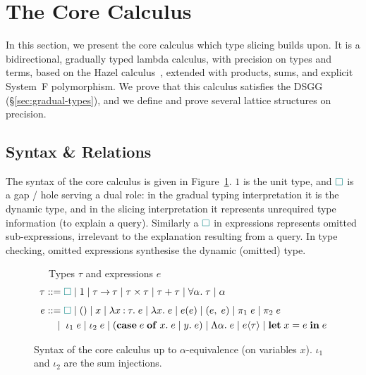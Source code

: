 \section{The Core Calculus}
\label{sec:core-calculus}

In this section, we present the core calculus which type slicing builds upon. It is a bidirectional, gradually typed lambda calculus, with precision on types and terms, based on the Hazel calculus~\cite{HazelLivePaper}, extended with products, sums, and explicit System~F polymorphism. We prove that this calculus satisfies the DSGG (\S\ref{sec:gradual-types}), and we define and prove several lattice structures on precision.

\subsection{Syntax \& Relations}
\label{sec:core-syntax}

The syntax of the core calculus is given in Figure~\ref{fig:syntax}. $1$ is the unit type, and ${\color{teal}\Box}$ is a gap / hole serving a dual role: in the gradual typing interpretation it is the dynamic type, and in the slicing interpretation it represents unrequired type information (to explain a query). Similarly a ${\color{teal}\Box}$ in expressions represents omitted sub-expressions, irrelevant to the explanation resulting from a query. In type checking, omitted expressions synthesise the dynamic (omitted) type.

\begin{figure}[b]
\ \ \ Types $\tau$ and expressions $e$
\begin{align*}
\tau &::= {\color{teal}\Box} \mid 1 \mid \tau \mathbin{\to} \tau \mid \tau \times \tau \mid \tau + \tau \mid \forall\alpha.\;\tau \mid \alpha \\[4pt]
e &::= {\color{teal}\Box} \mid () \mid x \mid \lambda x \mathbin{:} \tau.\; e \mid \lambda x.\; e \mid e(e) \mid (e,\; e) \mid \pi_1\; e \mid \pi_2\; e \\
  &\quad\mid\; \iota_1\; e \mid \iota_2\; e \mid (\mathbf{case}\;e\;\mathbf{of}\;x.\;e \mid y.\;e) \mid \Lambda\alpha.\; e \mid e\langle\tau\rangle \mid \mathbf{let}\;x = e\;\mathbf{in}\;e
\end{align*}

\caption{Syntax of the core calculus up to $\alpha$-equivalence (on variables $x$). $\iota_1$ and $\iota_2$ are the sum injections.}
\label{fig:syntax}
\end{figure}

